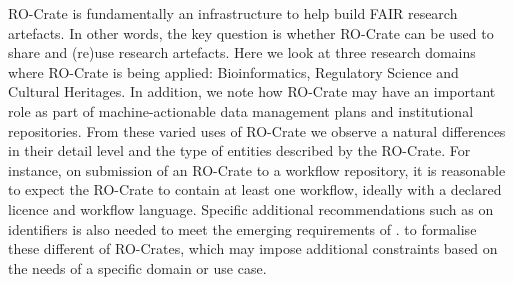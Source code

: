 \markdownRendererInterblockSeparator
{}RO-Crate is fundamentally an infrastructure to help build FAIR research artefacts. In other words, the key question is whether RO-Crate can be used to share and (re)use research artefacts. Here we look at three research domains where RO-Crate is being applied: Bioinformatics, Regulatory Science and Cultural Heritages. In addition, we note how RO-Crate may have an important role as part of machine-actionable data management plans and institutional repositories.\markdownRendererInterblockSeparator
{}From these varied uses of RO-Crate we observe a natural differences in their detail level and the type of entities described by the RO-Crate. For instance, on submission of an RO-Crate to a workflow repository, it is reasonable to expect the RO-Crate to contain at least one workflow, ideally with a declared licence and workflow language. Specific additional recommendations such as on identifiers is also needed to meet the emerging requirements of .  to formalise these different  of RO-Crates, which may impose additional constraints based on the needs of a specific domain or use case. \relax
